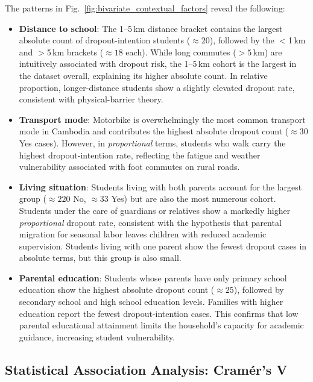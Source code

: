 The patterns in Fig.~\ref{fig:bivariate_contextual_factors} reveal the following:

\begin{itemize}
    \item \textbf{Distance to school}: The 1--5\,km distance bracket contains the largest absolute count of dropout-intention students ($\approx 20$), followed by the $<$1\,km and $>$5\,km brackets ($\approx 18$ each). While long commutes (${>}5$\,km) are intuitively associated with dropout risk, the 1--5\,km cohort is the largest in the dataset overall, explaining its higher absolute count. In relative proportion, longer-distance students show a slightly elevated dropout rate, consistent with physical-barrier theory.

    \item \textbf{Transport mode}: Motorbike is overwhelmingly the most common transport mode in Cambodia and contributes the highest absolute dropout count ($\approx 30$ Yes cases). However, in \textit{proportional} terms, students who walk carry the highest dropout-intention rate, reflecting the fatigue and weather vulnerability associated with foot commutes on rural roads.

    \item \textbf{Living situation}: Students living with both parents account for the largest group ($\approx 220$ No, $\approx 33$ Yes) but are also the most numerous cohort. Students under the care of guardians or relatives show a markedly higher \textit{proportional} dropout rate, consistent with the hypothesis that parental migration for seasonal labor leaves children with reduced academic supervision. Students living with one parent show the fewest dropout cases in absolute terms, but this group is also small.

    \item \textbf{Parental education}: Students whose parents have only primary school education show the highest absolute dropout count ($\approx 25$), followed by secondary school and high school education levels. Families with higher education report the fewest dropout-intention cases. This confirms that low parental educational attainment limits the household's capacity for academic guidance, increasing student vulnerability.
\end{itemize}

\subsection{Statistical Association Analysis: Cram\'{e}r's V}
\label{subsec:cramers_v_results}

